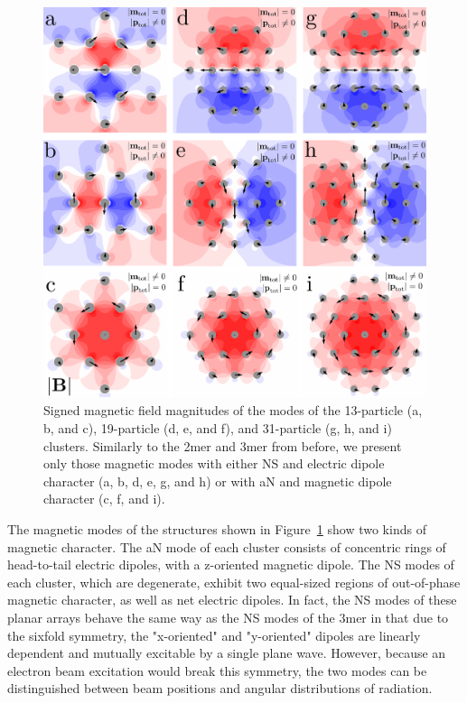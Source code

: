 \documentclass[journal=apchd5,manuscript=article]{achemso}
\begin{document}
\begin{figure}
\includegraphics[width=6in]{kagan_fields.pdf}
\caption{Signed magnetic field magnitudes of the modes of the 13-particle (a, b, and c), 19-particle (d, e, and f), and 31-particle (g, h, and i) clusters. Similarly to the 2mer and 3mer from before, we present only those magnetic modes with either NS and electric dipole character (a, b, d, e, g, and h) or with aN and magnetic dipole character (c, f, and i).}
\label{kagan_fields}
\end{figure}

The magnetic modes of the structures shown in Figure~\ref{kagan_fields} show two kinds of magnetic character. The aN mode of each cluster consists of concentric rings of head-to-tail electric dipoles, with a z-oriented magnetic dipole. The NS modes of each cluster, which are degenerate, exhibit two equal-sized regions of out-of-phase magnetic character, as well as net electric dipoles. In fact, the NS modes of these planar arrays behave the same way as the NS modes of the 3mer in that due to the sixfold symmetry, the "x-oriented" and "y-oriented" dipoles are linearly dependent and mutually excitable by a single plane wave. However, because an electron beam excitation would break this symmetry, the two modes can be distinguished between beam positions and angular distributions of radiation.
\end{document}
